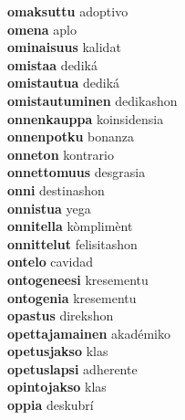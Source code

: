\textbf{omaksuttu } adoptivo \\
\textbf{omena } aplo \\
\textbf{ominaisuus } kalidat \\
\textbf{omistaa } dediká \\
\textbf{omistautua } dediká \\
\textbf{omistautuminen } dedikashon \\
\textbf{onnenkauppa } koinsidensia \\
\textbf{onnenpotku } bonanza \\
\textbf{onneton } kontrario \\
\textbf{onnettomuus } desgrasia \\
\textbf{onni } destinashon \\
\textbf{onnistua } yega \\
\textbf{onnitella } kòmplimènt \\
\textbf{onnittelut } felisitashon \\
\textbf{ontelo } cavidad \\
\textbf{ontogeneesi } kresementu \\
\textbf{ontogenia } kresementu \\
\textbf{opastus } direkshon \\
\textbf{opettajamainen } akadémiko \\
\textbf{opetusjakso } klas \\
\textbf{opetuslapsi } adherente \\
\textbf{opintojakso } klas \\
\textbf{oppia } deskubrí \\
